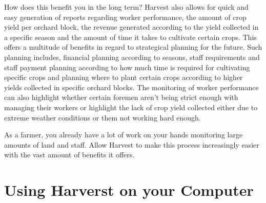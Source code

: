 \documentclass[11pt,fleqn]{book} %
\begin{document}
		How does this benefit you in the long term? Harvest also allows for quick and easy generation of reports regarding worker performance, the amount of crop yield per orchard block, the revenue generated according to the yield collected in a specific season and the amount of time it takes to cultivate certain crops. This offers a multitude of benefits in regard to strategical planning for the future. Such planning includes, financial planning according to seasons, staff requirements and staff payment planning according to how much time is required for cultivating specific crops and planning where to plant certain crops according to higher yields collected in specific orchard blocks. The monitoring of worker performance can also highlight whether certain foremen aren't being strict enough with managing their workers or highlight the lack of crop yield collected either due to extreme weather conditions or them not working hard enough.\newline\newline
		
		As a farmer, you already have a lot of work on your hands monitoring large amounts of land and staff. Allow Harvest to make this process increasingly easier with the vast amount of benefits it offers.

		
	\section{Using Harverst on your Computer}
\end{document}
